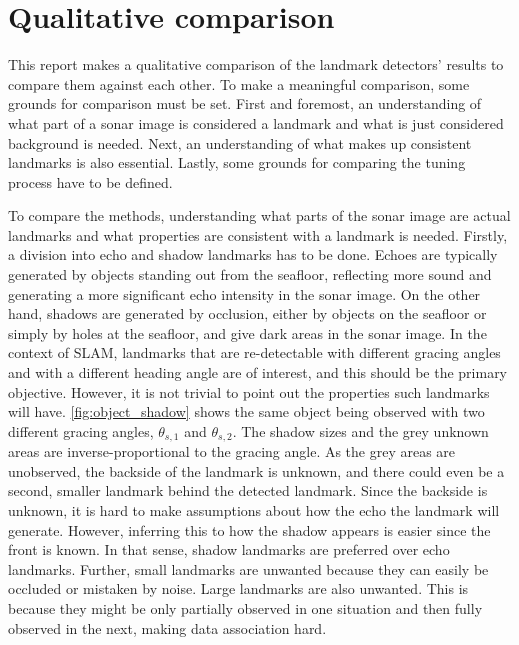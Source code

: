 \section{Qualitative comparison}

This report makes a qualitative comparison of the landmark detectors' results to compare them against each other. To make a meaningful comparison, some grounds for comparison must be set. First and foremost, an understanding of what part of a sonar image is considered a landmark and what is just considered background is needed. Next, an understanding of what makes up consistent landmarks is also essential. Lastly, some grounds for comparing the tuning process have to be defined. 

To compare the methods, understanding what parts of the sonar image are actual landmarks and what properties are consistent with a landmark is needed. Firstly, a division into echo and shadow landmarks has to be done. Echoes are typically generated by objects standing out from the seafloor, reflecting more sound and generating a more significant echo intensity in the sonar image. On the other hand, shadows are generated by occlusion, either by objects on the seafloor or simply by holes at the seafloor, and give dark areas in the sonar image. In the context of SLAM, landmarks that are re-detectable with different gracing angles and with a different heading angle are of interest, and this should be the primary objective. However, it is not trivial to point out the properties such landmarks will have. \cref{fig:object_shadow} shows the same object being observed with two different gracing angles, $\theta_{s,1}$ and $\theta_{s,2}$. The shadow sizes and the grey unknown areas are inverse-proportional to the gracing angle. As the grey areas are unobserved, the backside of the landmark is unknown, and there could even be a second, smaller landmark behind the detected landmark. Since the backside is unknown, it is hard to make assumptions about how the echo the landmark will generate. However, inferring this to how the shadow appears is easier since the front is known. In that sense, shadow landmarks are preferred over echo landmarks. Further, small landmarks are unwanted because they can easily be occluded or mistaken by noise. Large landmarks are also unwanted. This is because they might be only partially observed in one situation and then fully observed in the next, making data association hard. 

